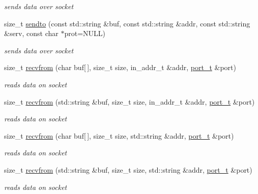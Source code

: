 \begin{CompactItemize}
\begin{CompactItemize}
\begin{CompactList}\small\item\em sends data over socket \item\end{CompactList}\item 
size\_\-t \hyperlink{classsocketpp_1_1BaseSocket_5fd9737270ee71d2292e70ed625d63f9}{sendto} (const std::string \&buf, const std::string \&addr, const std::string \&serv, const char $\ast$prot=NULL)
\begin{CompactList}\small\item\em sends data over socket \item\end{CompactList}\item 
size\_\-t \hyperlink{classsocketpp_1_1BaseSocket_11ebe50d7ae76c21ef55d38cb87cc700}{recvfrom} (char buf\mbox{[}$\,$\mbox{]}, size\_\-t size, in\_\-addr\_\-t \&addr, \hyperlink{namespacesocketpp_5517ef80f249b891a2ba64b95fc1e723}{port\_\-t} \&port)
\begin{CompactList}\small\item\em reads data on socket \item\end{CompactList}\item 
size\_\-t \hyperlink{classsocketpp_1_1BaseSocket_d2656c57d84c4ff032cd3d9ad4608bfa}{recvfrom} (std::string \&buf, size\_\-t size, in\_\-addr\_\-t \&addr, \hyperlink{namespacesocketpp_5517ef80f249b891a2ba64b95fc1e723}{port\_\-t} \&port)
\begin{CompactList}\small\item\em reads data on socket \item\end{CompactList}\item 
size\_\-t \hyperlink{classsocketpp_1_1BaseSocket_205fc515468a3df01258f7ebd6fdf38c}{recvfrom} (char buf\mbox{[}$\,$\mbox{]}, size\_\-t size, std::string \&addr, \hyperlink{namespacesocketpp_5517ef80f249b891a2ba64b95fc1e723}{port\_\-t} \&port)
\begin{CompactList}\small\item\em reads data on socket \item\end{CompactList}\item 
size\_\-t \hyperlink{classsocketpp_1_1BaseSocket_259bb054a2abf0ffadf3c75bce4892b0}{recvfrom} (std::string \&buf, size\_\-t size, std::string \&addr, \hyperlink{namespacesocketpp_5517ef80f249b891a2ba64b95fc1e723}{port\_\-t} \&port)
\begin{CompactList}\small\item\em reads data on socket \item\end{CompactList}\item 

\end{CompactItemize}
\end{CompactItemize}
